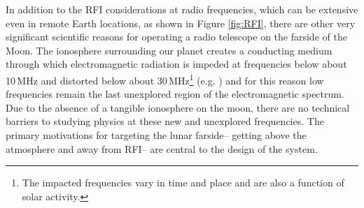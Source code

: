In addition to the RFI considerations at radio frequencies, which can be extensive even in remote Earth locations, as shown in Figure \ref{fig:RFI}, there are other very significant scientific reasons for operating a radio telescope on the farside of the Moon. The ionosphere surrounding our planet creates a conducting medium through which electromagnetic radiation is impeded at frequencies below about 10\,MHz and distorted below about 30\,MHz\footnote{The impacted frequencies vary in time and place and are also a function of solar activity.} (e.g. \citealt{Zawdie_2017RS006256}) and for this reason low frequencies remain the last unexplored region of the electromagnetic spectrum.
Due to the absence of a tangible ionosphere on the moon, there are no technical barriers to studying physics at these new and unexplored frequencies. The primary motivations for targeting the lunar farside-- getting above the atmosphere and away from RFI-- are central to the design of the system. 

